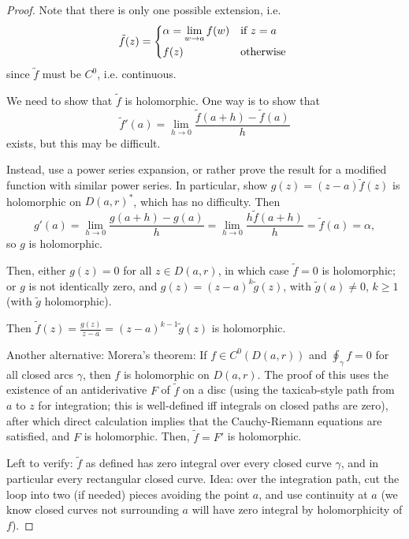 \documentclass{artikel3}
\newcommand{\alt}[1]{\tilde{#1}}
\numberwithin{equation}{enumi}
\begin{document}
\begin{proof}
	Note that there is only one possible extension, i.e. \[
		\alt{f}(z)=\begin{dcases*}
			\alpha=\lim_{w\to a}f(w)&if $z=a$\\
			f(z)&otherwise
		\end{dcases*}
	\] since $\alt{f}$ must be $C^0$, i.e. continuous.
	
	We need to show that $\alt{f}$ is holomorphic.  One way
	is to show that \[
		\alt{f}'(a)=\lim_{h\to 0}\frac{\alt{f}(a+h)-\alt{f}(a)}{h}
	\] exists, but this may be difficult.
	
	Instead, use a power series expansion, or rather prove the result
	for a modified function with similar power series.  In particular,
	show $g(z)=(z-a)\alt{f}(z)$ is holomorphic on $D(a,r)^*$, which
	has no difficulty.  Then \[
		g'(a)=\lim_{h\to 0}\frac{g(a+h)-g(a)}{h}
		= \lim_{h\to 0}\frac{h\alt{f}(a+h)}{h}=\alt{f}(a)=\alpha,
	\] so $g$ is holomorphic.
	
	Then, either $g(z)=0$ for all $z\in D(a,r)$, in which
	case $\alt{f}=0$ is holomorphic; or $g$ is not identically zero,
	and $g(z)=(z-a)^k\alt{g}(z)$, with $\alt{g}(a)\neq 0$, $k\geq 1$
	(with $\alt{g}$ holomorphic).
	
	Then $\alt{f}(z)=\frac{g(z)}{z-a}=(z-a)^{k-1}\alt{g}(z)$ is holomorphic.
	
	Another alternative: Morera's theorem: If $f\in C^0(D(a,r))$ and $\oint_\gamma f=0$
	for all closed arcs $\gamma$, then $f$ is holomorphic on $D(a,r)$.
	The proof of this uses the existence of an antiderivative
	$F$ of $\alt{f}$ on a disc (using the taxicab-style path from $a$ to $z$
	for integration; this is well-defined iff integrals
	on closed paths are zero),
	after which direct calculation implies that the Cauchy-Riemann
	equations are satisfied, and $F$ is holomorphic.  Then,
	$\alt{f}=F'$ is holomorphic.
	
	Left to verify: $\alt{f}$ as defined has zero integral over every
	closed curve $\gamma$, and in particular every rectangular closed curve.
	Idea: over the integration path, cut the loop into two (if needed)
	pieces avoiding the point $a$, and use continuity at $a$ (we know
	closed curves not surrounding $a$ will have zero integral by holomorphicity
	of $f$).
\end{proof}
\label{lastpage}
\end{document}
